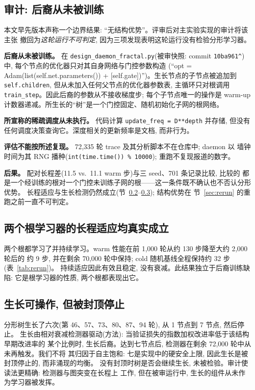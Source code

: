 \documentclass[11pt]{article}
\begin{document}
\subsection{审计: 后裔从未被训练}\label{sec:audit}

本文早先版本声称一个边界结果: ``无结构优势''。评审后对主实验实现的审计将该主张
撤回为\emph{这轮运行不可判定}, 因为三项发现表明这轮运行没有检验分形学习器。

\textbf{后裔从未被训练。} 在 \texttt{design\_daemon\_fractal.py}(被审快照: commit
\texttt{10ba961\textasciicircum})中, 每个节点的优化器只对其自身网络与门控参数构造
(``opt = Adam(list(self.net.parameters()) + [self.gate])'')。生长节点的子节点被追加到
\texttt{self.children}, 但从未加入任何父节点的优化器参数表, 主循环只对根调用
\texttt{train\_step}。因此后裔的参数从不接收梯度步; 每个子节点唯一的操作是 warm-up
计数器递减。所生长的``树''是一个门控固定、随机初始化子网的根网络。

\textbf{所宣称的稀疏调度从未执行。} 代码计算 \texttt{update\_freq = D**depth} 并存储,
但没有任何调度决策查询它。深度相关的更新频率是文档, 而非行为。

\textbf{评估不能按所述复现。} 72,335 轮 trace 及其分析脚本不在仓库中; daemon 以
墙钟时间为其 RNG 播种(\texttt{int(time.time()) \% 10000}); 重跑不复现报道的数字。

\textbf{后果。} 配对长程差(11.5 vs.\ 11.1 warm 步)与三 seed、701 条记录比较, 比较的
都是一个经训练的根对一个门控未训练子网的根——这一条件既不确认也不否认分形优势。
长程适应与生长检测仍然成立(节~\ref{sec:adapt}--\ref{sec:growth}); 结构优势在
节~\ref{sec:rerun} 的重跑之前一直不可判定。

\subsection{两个根学习器的长程适应均真实成立}\label{sec:adapt}

两个根都学习了并持续学习。warm 性能在前 1,000 轮从约 130 步降至大约 2,000 轮后的
约 9 步, 并在剩余 70,000 轮中保持; cold 随机基线全程保持约 32 步(表~\ref{tab:rerun})。
持续适应因此有效且稳定, 没有衰减。此结果独立于后裔训练缺陷: 它是根学习器的性质,
两个根都表现出它。

\subsection{生长可操作, 但被封顶停止}\label{sec:growth}

分形树生长了六次(第 46、57、73、80、87、94 轮), 从 1 节点到 7 节点, 然后停止。
生长由相对衰减检测器驱动(方法): 当验证损失的指数加权改进率低于该结构早期改进率的
某个比例时, 生长后裔。达到七节点后, 检测器在剩余 72,000 轮中从未再触发。我们不将
其归因于自主饱和: 七是实现中的硬安全上限, 因此生长是被封顶停止的, 而非涌现的均衡。
没有封顶时树是否会继续生长, 未被检验。审计使读法更精确: 检测器与图突变在长程上
工作, 但在被审运行中, 生长的组件从未作为学习器被发挥。
\end{document}
